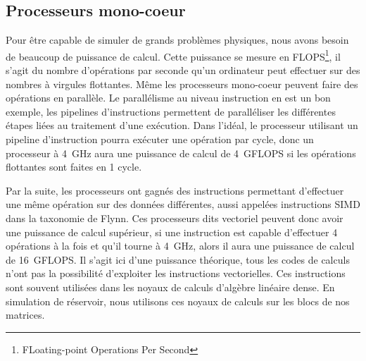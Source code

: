 \subsection{Processeurs mono-coeur}
Pour être capable de simuler de grands problèmes physiques, nous avons besoin de beaucoup de puissance de calcul.
%
Cette puissance se mesure en FLOPS\footnote{FLoating-point Operations Per Second}, il s'agit du nombre d'opérations par seconde qu'un ordinateur peut effectuer sur des nombres à virgules flottantes.
%
Même les processeurs mono-coeur peuvent faire des opérations en parallèle.
%
Le parallélisme au niveau instruction en est un bon exemple, les pipelines d'instructions permettent de paralléliser les différentes étapes liées au traitement d'une exécution.
%
Dans l'idéal, le processeur utilisant un pipeline d'instruction pourra exécuter une opération par cycle, donc un processeur à 4~GHz aura une puissance de calcul de 4~GFLOPS si les opérations flottantes sont faites en 1 cycle.


Par la suite, les processeurs ont gagnés des instructions permettant d'effectuer une même opération sur des données différentes, aussi appelées instructions SIMD dans la taxonomie de Flynn.
%
Ces processeurs dits vectoriel peuvent donc avoir une puissance de calcul supérieur, si une instruction est capable d'effectuer 4 opérations à la fois et qu'il tourne à 4~GHz, alors il aura une puissance de calcul de 16~GFLOPS.
%
Il s'agit ici d'une puissance théorique, tous les codes de calculs n'ont pas la possibilité d'exploiter les instructions vectorielles.
%
Ces instructions sont souvent utilisées dans les noyaux de calculs d'algèbre linéaire dense.
%
En simulation de réservoir, nous utilisons ces noyaux de calculs sur les blocs de nos matrices.
